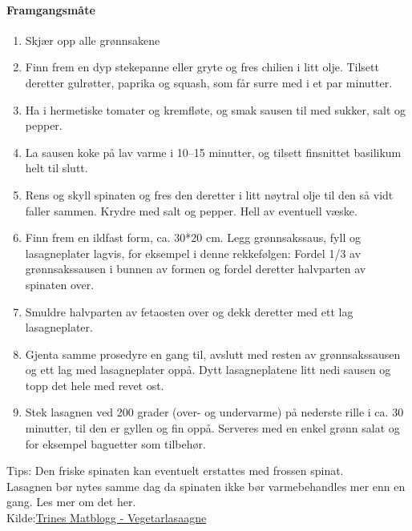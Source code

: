 \paragraph{Framgangsmåte}
\begin{enumerate}[noitemsep]
	\item Skjær opp alle grønnsakene
	\item Finn frem en dyp stekepanne eller gryte og fres chilien i litt olje. Tilsett
	deretter gulrøtter, paprika og squash, som får surre med i et par minutter.
	\item Ha i hermetiske tomater og kremfløte, og smak sausen til med sukker, salt og pepper.
	\item La sausen koke på lav varme i 10--15 minutter, og tilsett finsnittet basilikum	helt til slutt.
	\item Rens og skyll spinaten og fres den deretter i litt nøytral olje til den så vidt
	faller sammen. Krydre med salt og pepper. Hell av eventuell væske.
	\item Finn frem en ildfast form, ca. 30*20 cm. Legg grønnsakssaus, fyll og
	lasagneplater lagvis, for eksempel i denne rekkefølgen: Fordel 1/3 av
	grønnsakssausen i bunnen av formen og fordel deretter halvparten av spinaten over.
	\item Smuldre halvparten av fetaosten over og dekk deretter med ett lag lasagneplater.
	\item Gjenta samme prosedyre en gang til, avslutt med resten av grønnsakssausen og ett
	lag med lasagneplater oppå. Dytt lasagneplatene litt nedi sausen og topp det
	hele med revet ost.
	\item Stek lasagnen ved 200 grader (over- og undervarme) på nederste rille i ca. 30
	minutter, til den er gyllen og fin oppå. Serveres med en enkel grønn salat og
	for eksempel baguetter som tilbehør.
\end{enumerate}

Tips: Den friske spinaten kan eventuelt erstattes med frossen spinat.\\
    Lasagnen bør nytes samme dag da spinaten ikke bør varmebehandles mer enn en gang. Les mer om det her. \\

Kilde:\href{http://trinesmatblogg.no/2015/03/05/vegetarlasagne-med-spinat-og-feta/}{Trines Matblogg - Vegetarlasaagne}

